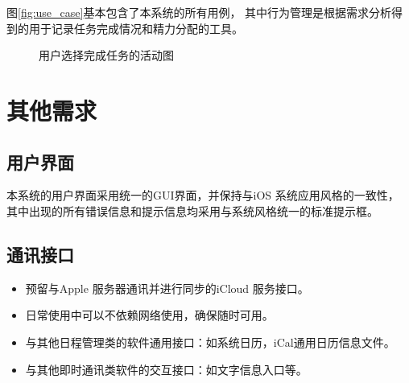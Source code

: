 图\ref{fig:use_case}基本包含了本系统的所有用例，
其中行为管理是根据需求分析得到的用于记录任务完成情况和精力分配的工具。

\begin{figure}[!htp]
	\centering
	\caption{用户选择完成任务的活动图}
    \label{fig:activity}
\end{figure}

\section{其他需求}
\subsection{用户界面}
本系统的用户界面采用统一的GUI界面，并保持与iOS 系统应用风格的一致性，
其中出现的所有错误信息和提示信息均采用与系统风格统一的标准提示框。

\subsection{通讯接口}
\begin{itemize}
	\item 预留与Apple 服务器通讯并进行同步的iCloud 服务接口。
	\item 日常使用中可以不依赖网络使用，确保随时可用。
	\item 与其他日程管理类的软件通用接口：如系统日历，iCal通用日历信息文件。
	\item 与其他即时通讯类软件的交互接口：如文字信息入口等。
\end{itemize}


